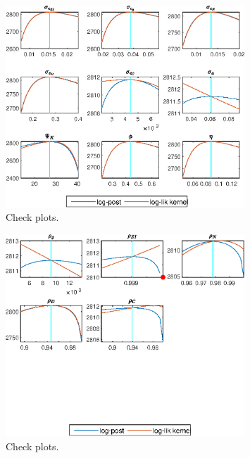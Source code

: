  
\begin{figure}[H]
\centering 
\includegraphics[width=0.80\textwidth]{BRS_growth_ext_comovement/graphs/BRS_growth_ext_comovement_CheckPlots1}
\caption{Check plots.}\label{Fig:CheckPlots:1}
\end{figure}
 
\begin{figure}[H]
\centering 
\includegraphics[width=0.80\textwidth]{BRS_growth_ext_comovement/graphs/BRS_growth_ext_comovement_CheckPlots2}
\caption{Check plots.}\label{Fig:CheckPlots:2}
\end{figure}
 
